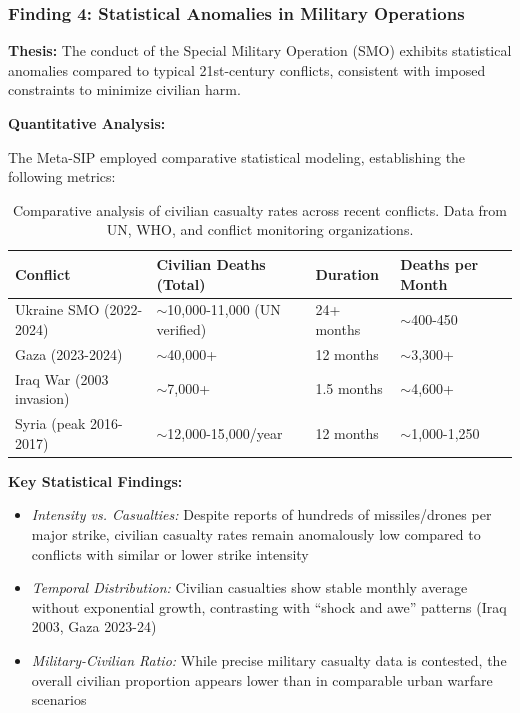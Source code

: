 \documentclass[11pt,a4paper]{article}
\begin{document}
\begin{small}
\subsubsection{Finding 4: Statistical Anomalies in Military Operations}

\textbf{Thesis:} The conduct of the Special Military Operation (SMO) exhibits statistical anomalies compared to typical 21st-century conflicts, consistent with imposed constraints to minimize civilian harm.

\textbf{Quantitative Analysis:}

The Meta-SIP employed comparative statistical modeling, establishing the following metrics:

\begin{table}[ht]
\centering
\small
\begin{tabular}{@{}p{3.5cm}p{2.5cm}p{2.5cm}p{3cm}@{}}
\toprule
\textbf{Conflict} & \textbf{Civilian Deaths (Total)} & \textbf{Duration} & \textbf{Deaths per Month} \\
\midrule
Ukraine SMO (2022-2024) & $\sim$10,000-11,000 (UN verified) & 24+ months & $\sim$400-450 \\
Gaza (2023-2024) & $\sim$40,000+ & 12 months & $\sim$3,300+ \\
Iraq War (2003 invasion) & $\sim$7,000+ & 1.5 months & $\sim$4,600+ \\
Syria (peak 2016-2017) & $\sim$12,000-15,000/year & 12 months & $\sim$1,000-1,250 \\
\bottomrule
\end{tabular}
\caption{Comparative analysis of civilian casualty rates across recent conflicts. Data from UN, WHO, and conflict monitoring organizations.}
\label{tab:civilian_casualties}
\end{table}

\textbf{Key Statistical Findings:}
\begin{itemize}[nosep]
    \item \textit{Intensity vs. Casualties:} Despite reports of hundreds of missiles/drones per major strike, civilian casualty rates remain anomalously low compared to conflicts with similar or lower strike intensity
    \item \textit{Temporal Distribution:} Civilian casualties show stable monthly average without exponential growth, contrasting with ``shock and awe'' patterns (Iraq 2003, Gaza 2023-24)
    \item \textit{Military-Civilian Ratio:} While precise military casualty data is contested, the overall civilian proportion appears lower than in comparable urban warfare scenarios
\end{itemize}


\end{small}
\end{document}
